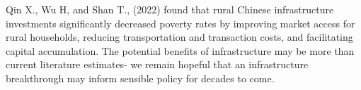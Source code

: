 \documentclass[11pt]{article}
\begin{document}
 Qin X., Wu H, and Shan T., (2022) found that rural Chinese infrastructure investments significantly decreased poverty rates by improving market access for rural households, reducing transportation and transaction costs, and facilitating capital accumulation. The potential benefits of infrastructure may be more than current literature estimates- we remain hopeful that an infrastructure breakthrough may inform sensible policy for decades to come. 

\newpage
\nocite{*}



 
\end{document}
